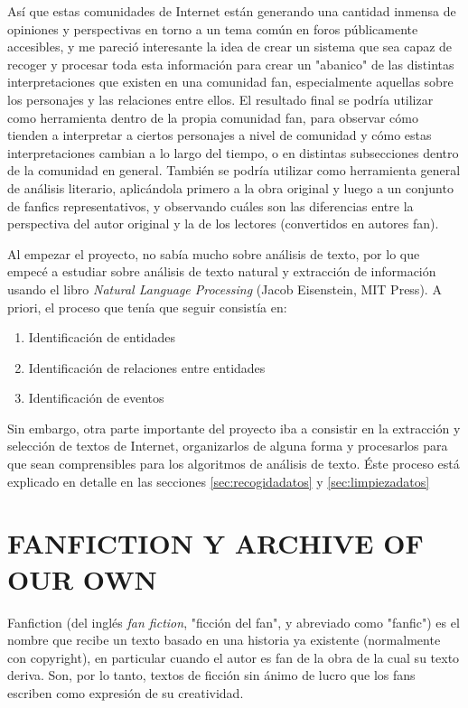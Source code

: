 \documentclass{pre-tfg}
\begin{document}
Así que estas comunidades de Internet están generando una cantidad inmensa de opiniones y perspectivas en torno a un tema común en foros públicamente accesibles, y me pareció interesante la idea de crear un sistema que sea capaz de recoger y procesar toda esta información para crear un "abanico" de las distintas interpretaciones que existen en una comunidad fan, especialmente aquellas sobre los personajes y las relaciones entre ellos. El resultado final se podría utilizar como herramienta dentro de la propia comunidad fan, para observar cómo tienden a interpretar a ciertos personajes a nivel de comunidad y cómo estas interpretaciones cambian a lo largo del tiempo, o en distintas subsecciones dentro de la comunidad en general. También se podría utilizar como herramienta general de análisis literario, aplicándola primero a la obra original y luego a un conjunto de fanfics representativos, y observando cuáles son las diferencias entre la perspectiva del autor original y la de los lectores (convertidos en autores fan).

Al empezar el proyecto, no sabía mucho sobre análisis de texto, por lo que empecé a estudiar sobre análisis de texto natural y extracción de información usando el libro \textit{Natural Language Processing} (Jacob Eisenstein, MIT Press). A priori, el proceso que tenía que seguir consistía en:

\begin{enumerate}
	\item Identificación de entidades
	\item Identificación de relaciones entre entidades
	\item Identificación de eventos
\end{enumerate}

Sin embargo, otra parte importante del proyecto iba a consistir en la extracción y selección de textos de Internet, organizarlos de alguna forma y procesarlos para que sean comprensibles para los algoritmos de análisis de texto. Éste proceso está explicado en detalle en las secciones \ref{sec:recogidadatos} y \ref{sec:limpiezadatos}


\section{FANFICTION Y ARCHIVE OF OUR OWN}

Fanfiction (del inglés \textit{fan fiction}, "ficción del fan", y abreviado como "fanfic") es el nombre que recibe un texto basado en una historia ya existente (normalmente con copyright), en particular cuando el autor es fan de la obra de la cual su texto deriva. Son, por lo tanto, textos de ficción sin ánimo de lucro que los fans escriben como expresión de su creatividad.
\end{document}

